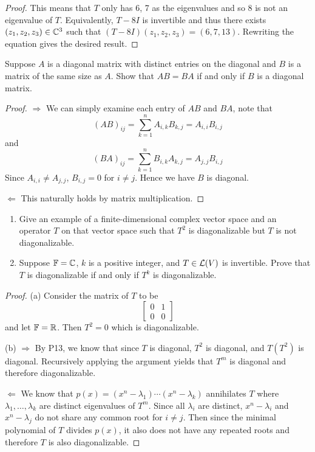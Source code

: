 \documentclass{extarticle}
\begin{document}
\begin{proof}
This means that \(T\) only has 6, 7 as the eigenvalues and so 8 is not an eigenvalue of \(T\). Equivalently, 
\(T - 8I\) is invertible and thus there exists \((z_1, z_2, z_3) \in \mathbb{C}^3\) such that \((T - 8I) 
(z_1, z_2, z_3) = (6, 7, 13)\). Rewriting the equation gives the desired result. 
\end{proof}

\begin{problem}{13}
    Suppose \(A\) is a diagonal matrix with distinct entries on the diagonal and \(B\) is a matrix of the same 
    size as \(A\). Show that \(AB = BA\) if and only if \(B\) is a diagonal matrix. 
\end{problem}

\begin{proof}
\(\Rightarrow\) We can simply examine each entry of \(AB\) and \(BA\), note that 
\[(AB)_{ij} = \sum_{k=1}^{n}A_{i, k}B_{k, j} = A_{i, i} B_{i, j}\]
and 
\[(BA)_{ij} = \sum_{k=1}^{n}B_{i, k}A_{k, j} = A_{j, j} B_{i, j}\]
Since \(A_{i, i} \neq A_{j, j}\), \(B_{i, j} = 0\) for \(i \neq j\). Hence we have \(B\) is diagonal. 

\(\Leftarrow\) This naturally holds by matrix multiplication. 
\end{proof}

\begin{problem}{14}
    \begin{enumerate}[label=(\alph*)]
        \item Give an example of a finite-dimensional complex vector space and an operator \(T\) on 
        that vector space such that \(T^2\) is diagonalizable but \(T\) is not diagonalizable. 
        \item Suppose \(\mathbb{F} = \mathbb{C}\), \(k\) is a positive integer, and \(T \in \mathcal{L}(V)\) is invertible. 
        Prove that \(T\) is diagonalizable if and only if \(T^k\) is diagonalizable.
    \end{enumerate}
\end{problem}

\begin{proof}
(a) Consider the matrix of \(T\) to be 
\[\begin{bmatrix}
    0 & 1 \\ 
    0 & 0
\end{bmatrix}\]
and let \(\mathbb{F} = \mathbb{R}\). Then \(T^2 = 0\) which is diagonalizable.

(b) \(\Rightarrow\) By P13, we know that since \(T\) is diagonal, \(T^2\) is diagonal, and 
\(T(T^2)\) is diagonal. Recursively applying the argument yields that \(T^m\) is diagonal and therefore 
diagonalizable. 

\(\Leftarrow\) We know that \(p(x) = (x^n - \lambda_1)\cdots(x^n - \lambda_k)\) annihilates \(T\) where 
\(\lambda_1, \ldots, \lambda_k\) are distinct eigenvalues of \(T^m\). Since all \(\lambda_i\) are distinct, 
\(x^n - \lambda_i\) and \(x^n - \lambda_j\) do not share any common root for \(i \neq j\). Then since the 
minimal polynomial of \(T\) divides \(p(x)\), it also does not have any repeated roots and therefore \(T\) 
is also diagonalizable. 
\end{proof}
\end{document}

